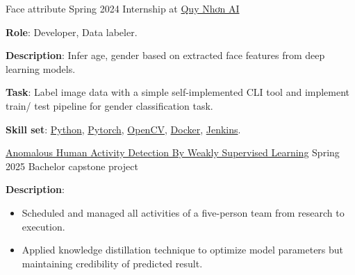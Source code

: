 \documentclass{src/preamble/doc_class}
\begin{document}
	\begin{MainPart}

        \Experience
        {\ColorHighlight}
        {Face attribute}
        {Spring 2024}
        {Internship at \href{https://qaidora.com/}{Quy Nhơn AI}}
        {
            \textbf{Role}: Developer, Data labeler.\\
            \vspace{.15cm}

            \textbf{Description}: Infer age, gender based on extracted face features from deep learning models.
            \vspace{.15cm}
            
            \textbf{Task}: Label image data with a simple self-implemented CLI tool and implement train/ test pipeline for gender classification task.\\
            \vspace{.15cm}

            \textbf{Skill set}: \href{https://www.python.org/}{Python}, \href{https://pytorch.org/}{Pytorch}, \href{https://opencv.org/}{OpenCV}, \href{https://www.docker.com/}{Docker}, \href{https://www.jenkins.io/}{Jenkins}.
        }

        \Experience
        {\ColorHighlight}
        {\href{https://github.com/diligent-man/Video_Anomaly_Detection}{Anomalous Human Activity Detection By Weakly Supervised Learning}}
        {Spring 2025}
        {Bachelor capstone project}
        {
            \textbf{Description}:
            \begin{itemize}[label=$\bullet$,topsep=-.5ex,itemsep=-0.5ex]
            	\item Scheduled and managed all activities of a five-person team from research to execution.
            	
            	\item Applied knowledge distillation technique to optimize model parameters but maintaining credibility of predicted result.
            	

\end{itemize}}
\end{MainPart}
\end{document}
